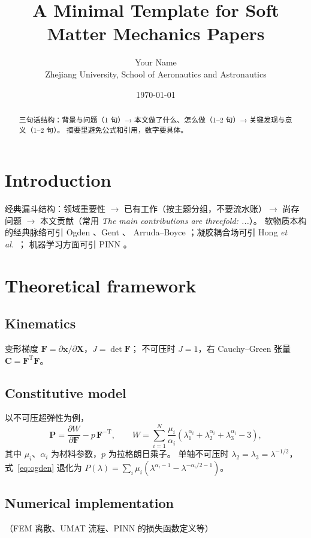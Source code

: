 \documentclass[11pt,a4paper]{article}
\title{A Minimal Template for Soft Matter Mechanics Papers}
\author{Your Name\\ Zhejiang University, School of Aeronautics and Astronautics}
\date{\today}
\newcommand{\FPK}{\ensuremath{\bm{P}}}        %
\newcommand{\FG}{\ensuremath{\bm{F}}}         %
\begin{document}
\maketitle

\begin{abstract}
三句话结构：背景与问题（1 句）→ 本文做了什么、怎么做（1--2 句）→ 关键发现与意义（1--2 句）。
摘要里避免公式和引用，数字要具体。
\end{abstract}

\section{Introduction}
经典漏斗结构：领域重要性 $\to$ 已有工作（按主题分组，不要流水账）$\to$ 尚存问题
$\to$ 本文贡献（常用 \emph{The main contributions are threefold: ...}）。
软物质本构的经典脉络可引 Ogden \cite{ogden1972}、Gent \cite{gent1996}、
Arruda--Boyce \cite{arruda1993}；凝胶耦合场可引 Hong \emph{et al.}\ \cite{hong2008}；
机器学习方面可引 PINN \cite{raissi2019}。

\section{Theoretical framework}
\subsection{Kinematics}
变形梯度 $\FG = \partial \bm{x}/\partial \bm{X}$，$J = \det \FG$；
不可压时 $J=1$，右 Cauchy--Green 张量 $\bm{C} = \FG^{\mathrm{T}}\FG$。

\subsection{Constitutive model}
以不可压超弹性为例，
\begin{equation}
  \FPK = \frac{\partial W}{\partial \FG} - p\,\FG^{-\mathrm{T}},
  \qquad
  W = \sum_{i=1}^{N} \frac{\mu_i}{\alpha_i}
      \left( \lambda_1^{\alpha_i} + \lambda_2^{\alpha_i} + \lambda_3^{\alpha_i} - 3 \right),
  \label{eq:ogden}
\end{equation}
其中 $\mu_i$、$\alpha_i$ 为材料参数，$p$ 为拉格朗日乘子。
单轴不可压时 $\lambda_2=\lambda_3=\lambda^{-1/2}$，式~\eqref{eq:ogden} 退化为
$P(\lambda) = \sum_i \mu_i \left( \lambda^{\alpha_i - 1} - \lambda^{-\alpha_i/2 - 1} \right)$。

\subsection{Numerical implementation}
（FEM 离散、UMAT 流程、PINN 的损失函数定义等）
\end{document}

